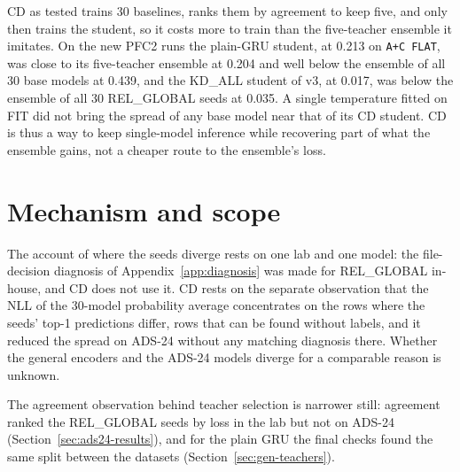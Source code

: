 CD as tested trains 30 baselines, ranks them by agreement to keep
five, and only then trains the student, so it costs more to train than
the five-teacher ensemble it imitates. On the new PFC2
runs the plain-GRU student, at 0.213 on \texttt{A+C FLAT}, was close to
its five-teacher ensemble at 0.204 and well below the ensemble of all 30
base models at 0.439, and the KD\_ALL student of v3, at 0.017, was below
the ensemble of all 30 REL\_GLOBAL seeds at 0.035. A single temperature
fitted on FIT did not bring the spread of any base model near that of
its CD student.
CD is thus a way to keep single-model inference while recovering part
of what the ensemble gains, not a cheaper route to the ensemble's loss.

\section{Mechanism and scope}
\label{sec:disc-mechanism}

The account of where the seeds diverge rests on one lab and one model:
the file-decision diagnosis of Appendix~\ref{app:diagnosis} was made for
REL\_GLOBAL in-house, and CD does not use it. CD rests on the separate
observation that the
NLL of the 30-model probability average concentrates on the
rows where the seeds' top-1 predictions differ, rows that can be found
without labels, and it reduced the
spread on ADS-24 without any matching diagnosis there.
Whether the general encoders and the ADS-24 models diverge for a
comparable reason is unknown.

The agreement observation behind teacher selection is narrower still:
agreement ranked the REL\_GLOBAL seeds by loss in the lab but not on
ADS-24 (Section~\ref{sec:ads24-results}), and for the plain GRU the
final checks found the same split between the datasets
(Section~\ref{sec:gen-teachers}).

